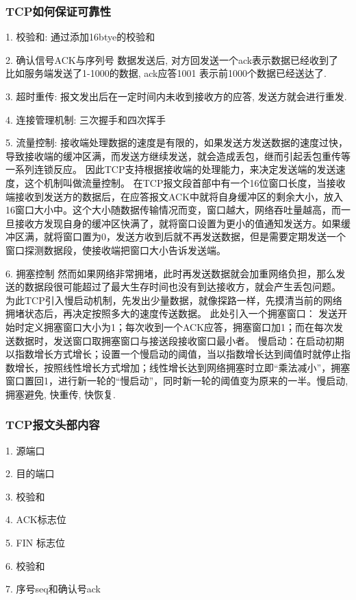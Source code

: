 \subsubsection{TCP如何保证可靠性}
1. 校验和: 通过添加16btye的校验和

2. 确认信号ACK与序列号
数据发送后, 对方回发送一个ack表示数据已经收到了 比如服务端发送了1-1000的数据, ack应答1001 表示前1000个数据已经送达了.

3. 超时重传: 报文发出后在一定时间内未收到接收方的应答, 发送方就会进行重发.

4. 连接管理机制: 三次握手和四次挥手

5. 流量控制: 接收端处理数据的速度是有限的，如果发送方发送数据的速度过快，导致接收端的缓冲区满，而发送方继续发送，就会造成丢包，继而引起丢包重传等一系列连锁反应。
因此TCP支持根据接收端的处理能力，来决定发送端的发送速度，这个机制叫做流量控制。
在TCP报文段首部中有一个16位窗口长度，当接收端接收到发送方的数据后，在应答报文ACK中就将自身缓冲区的剩余大小，放入16窗口大小中。这个大小随数据传输情况而变，窗口越大，网络吞吐量越高，而一旦接收方发现自身的缓冲区快满了，就将窗口设置为更小的值通知发送方。如果缓冲区满，就将窗口置为0，发送方收到后就不再发送数据，但是需要定期发送一个窗口探测数据段，使接收端把窗口大小告诉发送端。

6. 拥塞控制
然而如果网络非常拥堵，此时再发送数据就会加重网络负担，那么发送的数据段很可能超过了最大生存时间也没有到达接收方，就会产生丢包问题。
为此TCP引入慢启动机制，先发出少量数据，就像探路一样，先摸清当前的网络拥堵状态后，再决定按照多大的速度传送数据。
此处引入一个拥塞窗口：
发送开始时定义拥塞窗口大小为1；每次收到一个ACK应答，拥塞窗口加1；而在每次发送数据时，发送窗口取拥塞窗口与接送段接收窗口最小者。
慢启动：在启动初期以指数增长方式增长；设置一个慢启动的阈值，当以指数增长达到阈值时就停止指数增长，按照线性增长方式增加；线性增长达到网络拥塞时立即“乘法减小”，拥塞窗口置回1，进行新一轮的“慢启动”，同时新一轮的阈值变为原来的一半。慢启动, 拥塞避免, 快重传, 快恢复. \par

\subsubsection{TCP报文头部内容}
1. 源端口

2. 目的端口

3. 校验和

4. ACK标志位

5. FIN 标志位

6. 校验和

7. 序号seq和确认号ack



